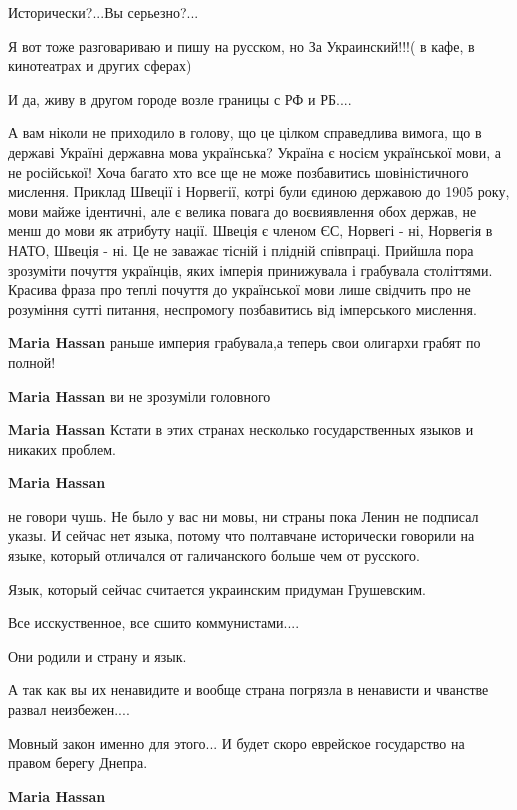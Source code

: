 \begin{itemize}
Исторически?...Вы серьезно?...

Я вот тоже разговариваю и пишу на русском, но За Украинский!!!( в кафе, в
кинотеатрах и других сферах)

И да, живу в другом городе возле границы с РФ и РБ....


А вам ніколи не приходило в голову, що це цілком справедлива вимога, що в
державі Україні державна мова українська? Україна є носієм української мови, а
не російської! Хоча багато хто все ще не може позбавитись шовіністичного
мислення. Приклад Швеції і Норвегії, котрі були єдиною державою до 1905 року,
мови майже ідентичні, але є велика повага до воєвиявлення обох держав, не менш
до мови як атрибуту нації. Швеція є членом ЄС, Норвегі - ні, Норвегія в НАТО,
Швеція - ні. Це не заважає тісній і плідній співпраці. Прийшла пора зрозуміти
почуття українців, яких імперія принижувала і грабувала століттями. Красива
фраза про теплі почуття до української мови лише свідчить про не розуміння
сутті питання, неспромогу позбавитись від імперського мислення.

\begin{itemize}

\textbf{Maria Hassan} раньше империя грабувала,а теперь свои олигархи грабят по полной!

\textbf{Maria Hassan} ви не зрозуміли головного

\textbf{Maria Hassan} Кстати в этих странах несколько государственных языков и никаких проблем.

\textbf{Maria Hassan} 

не говори чушь. Не было у вас ни мовы, ни страны пока Ленин не подписал указы.
И сейчас нет языка, потому что полтавчане исторически говорили на языке,
который отличался от галичанского больше чем от русского.

Язык, который сейчас считается украинским придуман Грушевским.

Все исскуственное, все сшито коммунистами....

Они родили и страну и язык.

А так как вы их ненавидите и вообще страна погрязла в ненависти и чванстве развал неизбежен....

Мовный закон именно для этого... И будет скоро еврейское государство на правом берегу Днепра.


\textbf{Maria Hassan} 


\end{itemize}
\end{itemize}

